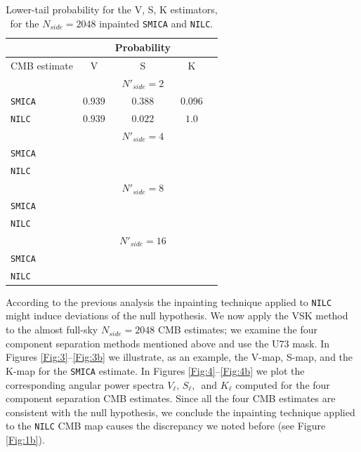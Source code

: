\begin{table}
\centering
\caption{Lower-tail probability for the V, S, K estimators, for the $N_{side} = 2048$ inpainted \texttt{SMICA} and \texttt{NILC}.}
\label{table:1}
\begin{tabular}{@{}lcccc}
\hline 
  & & Probability & \\
\hline  
CMB estimate & V & S & K \\ 
\hline  
 & & $N'_{side}=2$ & \\
\texttt{SMICA} & $0.939$ & $0.388$ & $0.096$ \\ 
\texttt{NILC} & $0.939$ & $0.022$ & $1.0$  \\
 & & $ N'_{side} = 4 $ & \\
\texttt{SMICA} & $ $ & $ $ & $ $ \\
\texttt{NILC} & $ $ & $ $ & $ $ \\ 
 & & $N'_{side} = 8$ & \\
\texttt{SMICA} & $ $ & $ $ & $ $ \\
\texttt{NILC} & $ $ & $ $ & $ $ \\
 & & $N'_{side} = 16$ & \\
\texttt{SMICA} & $ $ & $ $ & $ $ \\
\texttt{NILC} & $ $ & $ $ & $ $ \\
\hline
\end{tabular} 
\end{table}

According to the previous analysis the inpainting technique applied to \texttt{NILC} might induce deviations of the null hypothesis. We now apply the VSK method to the almost full-sky $N_{side}=2048$ CMB estimates; we examine the four component separation methods mentioned above and use the U73 mask. In Figures \ref{Fig:3}--\ref{Fig:3b} we illustrate, as an example, the V-map, S-map, and the K-map for the \texttt{SMICA} estimate. In Figures \ref{Fig:4}--\ref{Fig:4b} we plot the corresponding angular power spectra $V_{\ell},\, S_{\ell},\, $ and $K_{\ell}$ computed for the four component separation CMB estimates. Since all the four CMB estimates are consistent with the null hypothesis, we conclude the inpainting technique applied to the \texttt{NILC} CMB map causes the discrepancy we noted before (see Figure \ref{Fig:1b}). %

